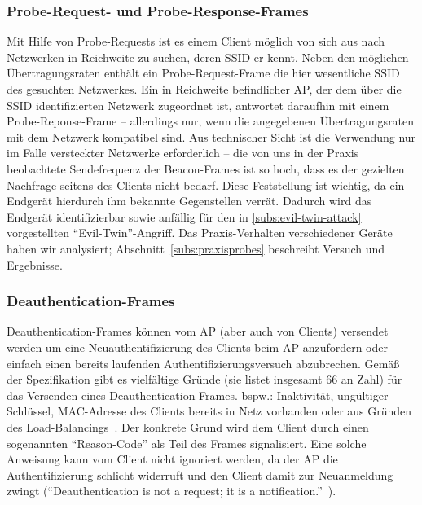 \subsubsection{Probe-Request- und Probe-Response-Frames}\label{subs:probes}
Mit Hilfe von Probe-Requests ist es einem Client möglich von sich aus nach Netzwerken in Reichweite zu suchen, deren SSID er kennt. 
Neben den möglichen Übertragungsraten enthält ein Probe-Request-Frame die hier wesentliche SSID des gesuchten Netzwerkes. 
Ein in Reichweite befindlicher AP, der dem über die SSID identifizierten Netzwerk zugeordnet ist, antwortet daraufhin mit einem Probe-Reponse-Frame -- allerdings nur, wenn die angegebenen Übertragungsraten mit dem Netzwerk kompatibel sind. 
Aus technischer Sicht ist die Verwendung nur im Falle versteckter Netzwerke erforderlich -- die von uns in der Praxis beobachtete Sendefrequenz der Beacon-Frames ist so hoch, dass es der gezielten Nachfrage seitens des Clients nicht bedarf. 
Diese Feststellung ist wichtig, da ein Endgerät hierdurch ihm bekannte Gegenstellen verrät. 
Dadurch wird das Endgerät identifizierbar sowie anfällig für den in \ref{subs:evil-twin-attack} vorgestellten \enquote{Evil-Twin}-Angriff. 
Das Praxis-Verhalten verschiedener Geräte haben wir analysiert; Abschnitt~\ref{subs:praxisprobes} beschreibt Versuch und Ergebnisse.

\subsubsection{Deauthentication-Frames}\label{subs:deauthentication-frames}
Deauthentication-Frames können vom AP (aber auch von Clients) versendet werden um eine Neuauthentifizierung des Clients beim AP anzufordern oder einfach einen bereits laufenden Authentifizierungsversuch abzubrechen. 
Gemäß der Spezifikation gibt es vielfältige Gründe (sie listet insgesamt 66 an Zahl) für das Versenden eines Deauthentication-Frames. bspw.: Inaktivität, ungültiger Schlüssel, MAC-Adresse des Clients bereits in Netz vorhanden oder aus Gründen des Load-Balancings~\cite[S. 74, S. 442]{ieee802.11}.
Der konkrete Grund wird dem Client durch einen sogenannten \enquote{Reason-Code} als Teil des Frames signalisiert. 
Eine solche Anweisung kann vom Client nicht ignoriert werden, da der AP die Authentifizierung schlicht widerruft und den Client damit zur Neuanmeldung zwingt (\enquote{Deauthentication is not a request; it is a notification.}~\cite[S. 74]{ieee802.11}).
 
